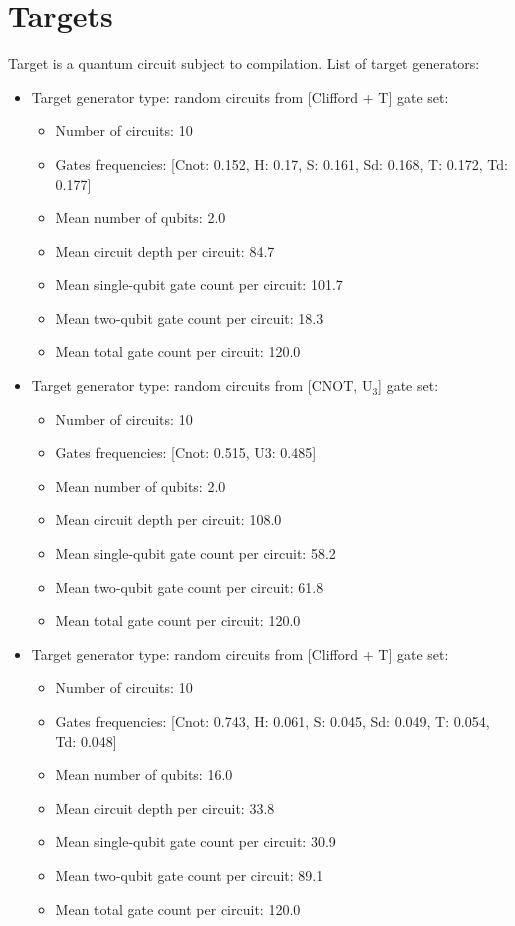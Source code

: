 \documentclass{report}%
\begin{document}
%
\section{Targets}%
\label{sec:Targets}%
Target is a quantum circuit subject to compilation. List of target generators: %
\begin{itemize}%
\item%
Target generator type: random circuits from [Clifford + T] gate set:%
\begin{itemize}%
\item%
Number of circuits: 10%
\item%
Gates frequencies: {[}Cnot: 0.152, H: 0.17, S: 0.161, Sd: 0.168, T: 0.172, Td: 0.177{]}%
\item%
Mean number of qubits: 2.0%
\item%
Mean circuit depth per circuit: 84.7%
\item%
Mean single{-}qubit gate count per circuit: 101.7%
\item%
Mean two{-}qubit gate count per circuit: 18.3%
\item%
Mean total gate count per circuit: 120.0%
\end{itemize}%
\end{itemize}%
\begin{itemize}%
\item%
Target generator type: random circuits from [CNOT, U$_3$] gate set:%
\begin{itemize}%
\item%
Number of circuits: 10%
\item%
Gates frequencies: {[}Cnot: 0.515, U3: 0.485{]}%
\item%
Mean number of qubits: 2.0%
\item%
Mean circuit depth per circuit: 108.0%
\item%
Mean single{-}qubit gate count per circuit: 58.2%
\item%
Mean two{-}qubit gate count per circuit: 61.8%
\item%
Mean total gate count per circuit: 120.0%
\end{itemize}%
\end{itemize}%
\begin{itemize}%
\item%
Target generator type: random circuits from [Clifford + T] gate set:%
\begin{itemize}%
\item%
Number of circuits: 10%
\item%
Gates frequencies: {[}Cnot: 0.743, H: 0.061, S: 0.045, Sd: 0.049, T: 0.054, Td: 0.048{]}%
\item%
Mean number of qubits: 16.0%
\item%
Mean circuit depth per circuit: 33.8%
\item%
Mean single{-}qubit gate count per circuit: 30.9%
\item%
Mean two{-}qubit gate count per circuit: 89.1%
\item%
Mean total gate count per circuit: 120.0%
\end{itemize}%
\end{itemize}%
\end{document}

